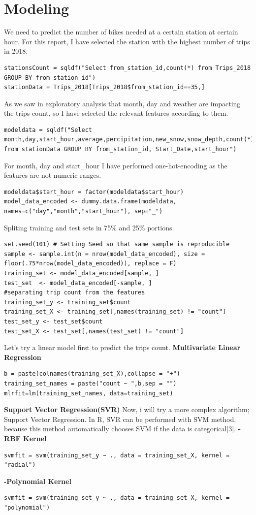 \documentclass[11pt]{article}
\begin{document}
\section{Modeling}
We need to predict the number of bikes needed at a certain station at certain hour. For this report, I have selected the station with the highest number of trips in 2018.
\begin{lstlisting}
stationsCount = sqldf("Select from_station_id,count(*) from Trips_2018 GROUP BY from_station_id")
stationData = Trips_2018[Trips_2018$from_station_id==35,]
\end{lstlisting}
As we saw in exploratory analysis that month, day and weather are impacting the trips count, so I have selected the relevant features according to them.
\begin{lstlisting}
modeldata = sqldf("Select month,day,start_hour,average,percipitation,new_snow,snow_depth,count(*) from stationData GROUP BY from_station_id, Start_Date,start_hour")
\end{lstlisting}
For month, day and start\_hour I have performed one-hot-encoding as the features are not numeric ranges.
\begin{lstlisting}
modeldata$start_hour = factor(modeldata$start_hour)
model_data_encoded <- dummy.data.frame(modeldata, names=c("day","month","start_hour"), sep="_")
\end{lstlisting}
Spliting training and test sets in 75\% and 25\% portions.
\begin{lstlisting}
set.seed(101) # Setting Seed so that same sample is reproducible
sample <- sample.int(n = nrow(model_data_encoded), size = floor(.75*nrow(model_data_encoded)), replace = F)
training_set <- model_data_encoded[sample, ]
test_set  <- model_data_encoded[-sample, ]
#separating trip count from the features
training_set_y <- training_set$count
training_set_X <- training_set[,names(training_set) != "count"]
test_set_y <- test_set$count
test_set_X <- test_set[,names(test_set) != "count"]
\end{lstlisting}
Let's try a linear model first to predict the trips count.\newline
\textbf{Multivariate Linear Regression}
\begin{lstlisting}
b = paste(colnames(training_set_X),collapse = "+")
training_set_names = paste("count ~ ",b,sep = "")
mlrfit=lm(training_set_names, data=training_set)
\end{lstlisting}
\textbf{Support Vector Regression(SVR)}\newline
Now, i will try a more complex algorithm; Support Vector Regression. In R, SVR can be performed with SVM method, because this method automatically chooses SVM if the data is categorical[3].\newline
\textbf{-RBF Kernel}
\begin{lstlisting}
svmfit = svm(training_set_y ~ ., data = training_set_X, kernel = "radial")
\end{lstlisting}
\textbf{-Polynomial Kernel}
\begin{lstlisting}
svmfit = svm(training_set_y ~ ., data = training_set_X, kernel = "polynomial")
\end{lstlisting}
\end{document}
